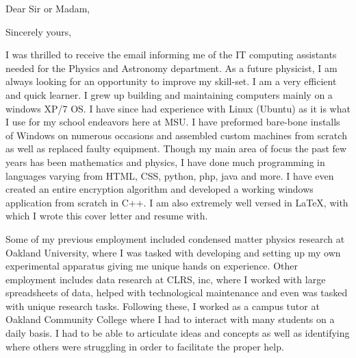 \documentclass[11pt,a4paper,sans]{moderncv} %
\begin{document}
\makecvtitle 



\date{\today} %
\opening{Dear Sir or Madam,} %

\closing{Sincerely yours,} %

\makelettertitle %

\hspace{1cm} I was thrilled to receive the email informing me of the IT computing assistants needed for the Physics and Astronomy department. As a future physicist, I am always looking for an opportunity to improve my skill-set. I am a very efficient and quick learner. I grew up building and maintaining computers mainly on a windows XP/7 OS. I have since had experience with Linux (Ubuntu) as it is what I use for my school endeavors here at MSU. I have preformed bare-bone installs of Windows on numerous occasions and assembled custom machines from scratch as well as replaced faulty equipment. Though my main area of focus the past few years has been mathematics and physics, I have done much programming in languages varying from HTML, CSS, python, php, java and more. I have even created an entire encryption algorithm and developed a working windows application from scratch in C++. I am also extremely well versed in \LaTeX, with which I wrote this cover letter and resume with.

\hspace{1cm} Some of my previous employment included condensed matter physics research at Oakland University, where I was tasked with developing and setting up my own experimental apparatus giving me unique hands on experience. Other employment includes data research at CLRS, inc, where I worked with large spreadsheets of data, helped with technological maintenance and even was tasked with unique research tasks. Following these, I worked as a campus tutor at Oakland Community College where I had to interact with many students on a daily basis. I had to be able to articulate ideas and concepts as well as identifying where others were struggling in order to facilitate the proper help. 
\end{document}
